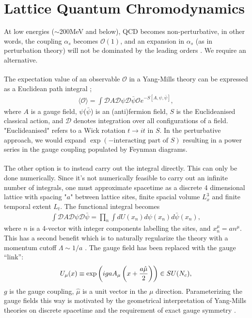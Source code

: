 \chapter{Lattice Quantum Chromodynamics}
\label{chap:latticeqcd}

At low energies ($\sim$200MeV and below), QCD becomes non-perturbative, in other words, the coupling $\alpha_s$ becomes $\mathcal{O}(1)$, and an expansion in $\alpha_s$ (as in perturbation theory) will not be dominated by the leading orders \cite{Schwartz:2013pla}. We require an alternative.
\\ \\
The expectation value of an observable $\mathcal{O}$ in a Yang-Mills theory can be expressed as a Euclidean path integral \cite{Lepage:1998dt};
\begin{align}
 \langle \mathcal{O} \rangle = \int \mathcal{D}A\mathcal{D}\psi\mathcal{D}\bar{\psi} \mathcal{O} e^{-S[A,\psi,\bar{\psi}]},
\end{align}
where $A$ is a gauge field, $\psi$($\bar{\psi}$) is an (anti)fermion field, $S$ is the Euclideanised classical action, and $\mathcal{D}$ denotes integration over all configurations of a field. "Euclideanised" refers to a Wick rotation $t\to it$ in $S$. In the perturbative approach, we would expand $\exp(-\text{interacting part of }S )$ resulting in a power series in
the gauge coupling populated by Feynman diagrams.
\\ \\
The other option is to instead carry out the integral directly. This can only be done numerically.
 Since it's not numerically feasible to carry out an infinite number of integrals, one must approximate spacetime as a discrete 4 dimensional lattice with spacing "$a$" between lattice sites, finite spacial volume $L_x^3$ and finite temporal extent $L_t$. The functional integral becomes
\begin{align}
 \int \mathcal{D}A\mathcal{D}\psi\mathcal{D}\bar{\psi} = \prod_{n} \int dU(x_n) d\psi(x_n) d\bar{\psi}(x_n),
\end{align}
where $n$ is a 4-vector with integer components labelling the sites, and $x_n^{\mu} = an^{\mu}$.
This has a second benefit which is to naturally regularize the theory with a momentum cutoff $\Lambda \sim 1/a$ \cite{Lepage:1998dt}. The gauge field has been replaced with the gauge
``link'':
\begin{align}
U_{\mu}(x) \equiv \exp\left(igaA_{\mu}\left(x+{a\hat{\mu}\over2}\right)\right) \in SU(N_c),
\end{align}
$g$ is the gauge coupling, $\hat{\mu}$ is a unit vector in the $\mu$ direction. Parameterizing the gauge fields this way is motivated by the geometrical interpretation of Yang-Mills theories on discrete spacetime and the requirement of exact gauge symmetry \cite{Munster:2000ez}.

